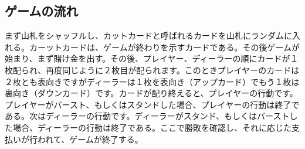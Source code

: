 \subsection{ゲームの流れ}
まず山札をシャッフルし、カットカードと呼ばれるカードを山札にランダムに入れる。カーットカードは、ゲームが終わりを示すカードである。その後ゲームが始まり、まず賭け金を出す。その後、プレイヤー、ディーラーの順にカードが１枚配られ、再度同じように２枚目が配られます。このときプレイヤーのカードは２枚とも表向きですがディーラーは１枚を表向き（アップカード）でもう１枚は裏向き（ダウンカード）です。カードが配り終えると、プレイヤーの行動です。プレイヤーがバースト、もしくはスタンドした場合、プレイヤーの行動は終了である。次はディーラーの行動です。ディーラーがスタンド、もしくはバーストした場合、ディーラーの行動は終了である。ここで勝敗を確認し、それに応じた支払いが行われて、ゲームが終了する。